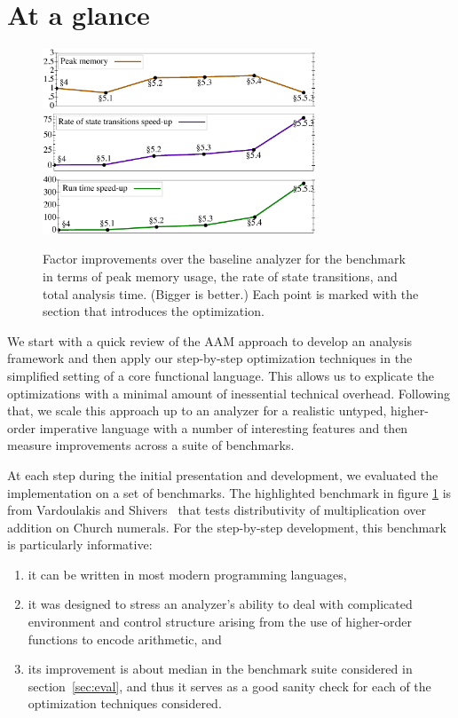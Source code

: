 \documentclass[preprint,onecolumn,9pt]{sigplanconf} %
\begin{document}
\section{At a glance}

\begin{figure}[t]
\begin{center}
\includegraphics[width=3.2in]{church-relative-space}
\includegraphics[width=3.2in]{church-relative-speed}
\includegraphics[width=3.2in]{church-relative-time}
\vspace{-1.5em}
\end{center}
\caption{Factor improvements over the baseline analyzer for the
  \Church{} benchmark in terms of peak memory usage, the rate of state
  transitions, and total analysis time. (Bigger is better.) Each point
  is marked with the section that introduces the optimization.}
\label{fig:churchtime}
\end{figure}


We start with a quick review of the AAM approach to develop an
analysis framework and then apply our step-by-step optimization
techniques in the simplified setting of a core functional language.
This allows us to explicate the optimizations with a minimal amount of
inessential technical overhead.  Following that, we scale this
approach up to an analyzer for a realistic untyped, higher-order
imperative language with a number of interesting features and then
measure improvements across a suite of benchmarks.

At each step during the initial presentation and development, we
evaluated the implementation on a set of benchmarks. The highlighted
benchmark in figure \ref{fig:churchtime} is from Vardoulakis and
Shivers~\cite{dvanhorn:Vardoulakis2011CFA2} that tests distributivity
of multiplication over addition on Church numerals.  For the
step-by-step development, this benchmark is particularly informative:
\begin{enumerate}
\item it can be written in most modern programming languages,
%
\item it was designed to stress an analyzer's ability to deal with
  complicated environment and control structure arising from the use
  of higher-order functions to encode arithmetic, and
%
\item its improvement is about median in the benchmark suite
  considered in section~\ref{sec:eval}, and thus it serves as a good
  sanity check for each of the optimization techniques considered.
\end{enumerate}
\end{document}
